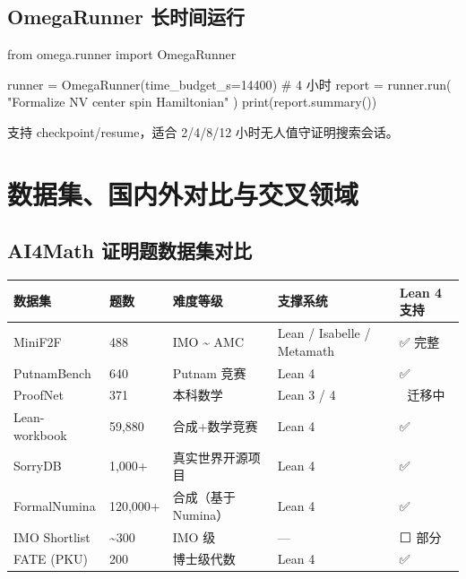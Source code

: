\documentclass[
  11pt,
  a4paper,
]{ctexrep}
\newenvironment{Shaded}{\begin{snugshade}}{\end{snugshade}}
\newcommand{\BuiltInTok}[1]{\textcolor[rgb]{0.00,0.23,0.31}{#1}}
\newcommand{\CommentTok}[1]{\textcolor[rgb]{0.37,0.37,0.37}{#1}}
\newcommand{\DecValTok}[1]{\textcolor[rgb]{0.68,0.00,0.00}{#1}}
\newcommand{\ImportTok}[1]{\textcolor[rgb]{0.00,0.46,0.62}{#1}}
\newcommand{\NormalTok}[1]{\textcolor[rgb]{0.00,0.23,0.31}{#1}}
\newcommand{\OperatorTok}[1]{\textcolor[rgb]{0.37,0.37,0.37}{#1}}
\newcommand{\StringTok}[1]{\textcolor[rgb]{0.13,0.47,0.30}{#1}}
\newcounter{none} %
\begin{document}
\section{OmegaRunner 长时间运行}\label{sec-runner}

\begin{Shaded}
\begin{Highlighting}[]
\ImportTok{from}\NormalTok{ omega.runner }\ImportTok{import}\NormalTok{ OmegaRunner}

\NormalTok{runner }\OperatorTok{=}\NormalTok{ OmegaRunner(time\_budget\_s}\OperatorTok{=}\DecValTok{14400}\NormalTok{)  }\CommentTok{\# 4 小时}
\NormalTok{report }\OperatorTok{=}\NormalTok{ runner.run(}
    \StringTok{"Formalize NV center spin Hamiltonian"}
\NormalTok{)}
\BuiltInTok{print}\NormalTok{(report.summary())}
\end{Highlighting}
\end{Shaded}

支持 checkpoint/resume，适合 2/4/8/12 小时无人值守证明搜索会话。

\newpage


\chapter{数据集、国内外对比与交叉领域}\label{ux6570ux636eux96c6ux56fdux5185ux5916ux5bf9ux6bd4ux4e0eux4ea4ux53c9ux9886ux57df}

\section{AI4Math 证明题数据集对比}\label{sec-datasets}

{\def\LTcaptype{none} %
\begin{longtable}[]{@{}lllll@{}}
\toprule\noalign{}
数据集 & 题数 & 难度等级 & 支撑系统 & Lean 4 支持 \\
\midrule\noalign{}
\endhead
\bottomrule\noalign{}
\endlastfoot
MiniF2F & 488 & IMO \textasciitilde{} AMC & Lean / Isabelle / Metamath &
✅ 完整 \\
PutnamBench & 640 & Putnam 竞赛 & Lean 4 & ✅ \\
ProofNet & 371 & 本科数学 & Lean 3 / 4 & 🔄 迁移中 \\
Lean-workbook & 59,880 & 合成+数学竞赛 & Lean 4 & ✅ \\
SorryDB & 1,000+ & 真实世界开源项目 & Lean 4 & ✅ \\
FormalNumina & 120,000+ & 合成（基于 Numina） & Lean 4 & ✅ \\
IMO Shortlist & \textasciitilde300 & IMO 级 & --- & ⬜ 部分 \\
FATE (PKU) & 200 & 博士级代数 & Lean 4 & ✅ \\
\end{longtable}
}
\end{document}
